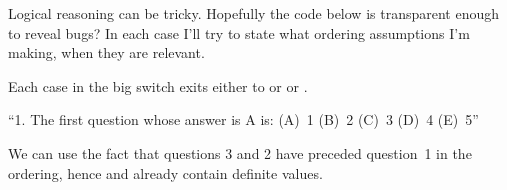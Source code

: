 Logical reasoning can be tricky. Hopefully the code below is transparent
enough to reveal bugs? In each case I'll try to state what ordering
assumptions I'm making, when they are relevant.

Each case in the big switch exits either to  or  or %
.

\fi

``1. The first question whose answer is A is: (A)~1 (B)~2
(C)~3 (D)~4 (E)~5''

We can use the fact that questions 3 and 2 have preceded question~1 in the
ordering, hence  and  already contain
definite values.

